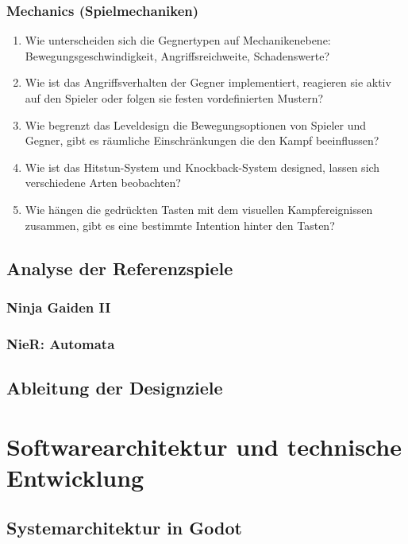 \documentclass[10pt, a4paper]{article}
\begin{document}
\subsubsection{Mechanics (Spielmechaniken)}
\begin{enumerate}[label=\textbf{M\arabic*}, leftmargin=1.5cm, itemsep=0.5em]
    \item Wie unterscheiden sich die Gegnertypen auf Mechanikenebene: Bewegungsgeschwindigkeit, Angriffsreichweite, Schadenswerte?
    \item Wie ist das Angriffsverhalten der Gegner implementiert, reagieren sie aktiv auf den Spieler oder folgen sie festen vordefinierten Mustern?
    \item Wie begrenzt das Leveldesign die Bewegungsoptionen von Spieler und Gegner, gibt es räumliche Einschränkungen die den Kampf beeinflussen?
    \item Wie ist das Hitstun-System und Knockback-System designed, lassen sich verschiedene Arten beobachten?
    \item Wie hängen die gedrückten Tasten mit dem visuellen Kampfereignissen zusammen, gibt es eine bestimmte Intention hinter den Tasten?
\end{enumerate}

\subsection{Analyse der Referenzspiele}
\label{sec:Referenzspiel}

\subsubsection{Ninja Gaiden II}
\subsubsection{NieR: Automata}
\subsection{Ableitung der Designziele}

\section{Softwarearchitektur und technische Entwicklung}
\subsection{Systemarchitektur in Godot}
\end{document}
